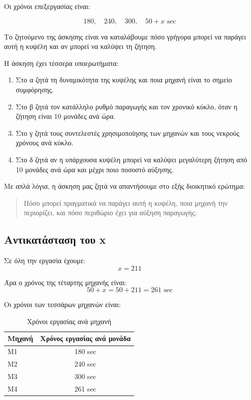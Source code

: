 \documentclass[12pt,a4paper]{article}
\begin{document}
Οι χρόνοι επεξεργασίας είναι:

\[
180,\quad 240,\quad 300,\quad 50+x \text{ sec}
\]

Το ζητούμενο της άσκησης είναι να καταλάβουμε πόσο γρήγορα μπορεί να παράγει αυτή η κυψέλη και αν μπορεί να καλύψει τη ζήτηση.

Η άσκηση έχει τέσσερα υποερωτήματα:

\begin{enumerate}
    \item Στο α ζητά τη δυναμικότητα της κυψέλης και ποια μηχανή είναι το σημείο συμφόρησης.
    \item Στο β ζητά τον κατάλληλο ρυθμό παραγωγής και τον χρονικό κύκλο, όταν η ζήτηση είναι 10 μονάδες ανά ώρα.
    \item Στο γ ζητά τους συντελεστές χρησιμοποίησης των μηχανών και τους νεκρούς χρόνους ανά κύκλο.
    \item Στο δ ζητά αν η υπάρχουσα κυψέλη μπορεί να καλύψει μεγαλύτερη ζήτηση από 10 μονάδες ανά ώρα και μέχρι ποιο ποσοστό αύξησης.
\end{enumerate}

Με απλά λόγια, η άσκηση μας ζητά να απαντήσουμε στο εξής διοικητικό ερώτημα:

\begin{quote}
Πόσο μπορεί πραγματικά να παράγει αυτή η κυψέλη, ποια μηχανή την περιορίζει, και πόσο περιθώριο έχει για αύξηση παραγωγής;
\end{quote}

\subsection{Αντικατάσταση του x}

Σε όλη την εργασία έχουμε:
\[
x=211
\]

Άρα ο χρόνος της τέταρτης μηχανής είναι:
\[
50+x=50+211=261 \text{ sec}
\]

Οι χρόνοι των τεσσάρων μηχανών είναι:

\begin{table}[H]
\centering
\caption{Χρόνοι εργασίας ανά μηχανή}
\begin{tabular}{lc}
\toprule
\textbf{Μηχανή} & \textbf{Χρόνος εργασίας ανά μονάδα} \\
\midrule
Μ1 & 180 sec \\
Μ2 & 240 sec \\
Μ3 & 300 sec \\
Μ4 & 261 sec \\
\bottomrule
\end{tabular}
\end{table}
\end{document}
